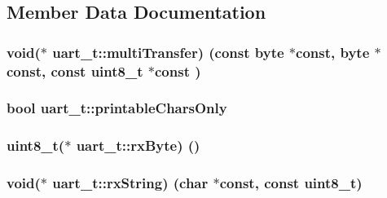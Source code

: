 \subsection{Member Data Documentation}
\hypertarget{structuart__t_a98300348c927208171e4f90006ce6819}{}
\subsubsection[{multi\+Transfer}]{\setlength{\rightskip}{0pt plus 5cm}void($\ast$ uart\+\_\+t\+::multi\+Transfer) (const {\bf byte} $\ast$const, {\bf byte} $\ast$const, const uint8\+\_\+t $\ast$const )}\label{structuart__t_a98300348c927208171e4f90006ce6819}
\hypertarget{structuart__t_a715d9d9174c62b5682150875555dac96}{}
\subsubsection[{printable\+Chars\+Only}]{\setlength{\rightskip}{0pt plus 5cm}bool uart\+\_\+t\+::printable\+Chars\+Only}\label{structuart__t_a715d9d9174c62b5682150875555dac96}
\hypertarget{structuart__t_a067e9b8ef10983dc10875ae71dff8b8e}{}
\subsubsection[{rx\+Byte}]{\setlength{\rightskip}{0pt plus 5cm}uint8\+\_\+t($\ast$ uart\+\_\+t\+::rx\+Byte) ()}\label{structuart__t_a067e9b8ef10983dc10875ae71dff8b8e}
\hypertarget{structuart__t_ad010210dd7bd23507a4db4591cf475d9}{}
\subsubsection[{rx\+String}]{\setlength{\rightskip}{0pt plus 5cm}void($\ast$ uart\+\_\+t\+::rx\+String) (char $\ast$const, const uint8\+\_\+t)}\label{structuart__t_ad010210dd7bd23507a4db4591cf475d9}
\hypertarget{structuart__t_a50600e28e57620e6eb51b0d5983bf41a}{}
